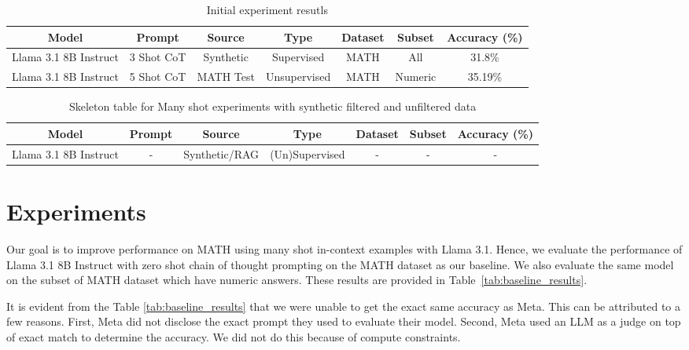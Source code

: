 \documentclass[twocolumn,11pt]{article}
\begin{document}
\begin{table*}
    \centering
    \begin{tabular}{|c|c|c|c|c|c|c|}
        \hline
        \textbf{Model} & \textbf{Prompt} & \textbf{Source}  & \textbf{Type} & \textbf{Dataset} & \textbf{Subset} & \textbf{Accuracy (\%)}\\
        \hline
        Llama 3.1 8B Instruct & 3 Shot CoT & Synthetic & Supervised & MATH & All & 31.8\% \\
        \hline
        Llama 3.1 8B Instruct & 5 Shot CoT & MATH Test & Unsupervised & MATH & Numeric & 35.19\% \\
        \hline
    \end{tabular}
    \caption{Initial experiment resutls}
    \label{tab:experiment_results}
\end{table*}

\begin{table*}[!h]
    \centering
    \begin{tabular}{|c|c|c|c|c|c|c|}
        \hline
        \textbf{Model} & \textbf{Prompt} & \textbf{Source}  & \textbf{Type} & \textbf{Dataset} & \textbf{Subset} & \textbf{Accuracy (\%)}\\
        \hline
        Llama 3.1 8B Instruct & - & Synthetic/RAG & (Un)Supervised & - & - & - \\
        \hline
    \end{tabular}
    \caption{Skeleton table for Many shot experiments with synthetic filtered and unfiltered data}
    \label{tab:synth_experiment_results}
\end{table*}

\section{Experiments} \label{sec:experiments}

Our goal is to improve performance on MATH using many shot in-context examples with Llama 3.1. Hence, we evaluate the performance of Llama 3.1 8B Instruct \cite{dubey2024llama3herdmodels} with zero shot chain of thought prompting on the MATH dataset as our baseline. We also evaluate the same model on the subset of MATH dataset which have numeric answers. These results are provided in Table~\ref{tab:baseline_results}. 

It is evident from the Table \ref{tab:baseline_results} that we were unable to get the exact same accuracy as Meta. This can be attributed to a few reasons. First, Meta did not disclose the exact prompt they used to evaluate their model. Second, Meta used an LLM as a judge on top of exact match to determine the accuracy. We did not do this because of compute constraints.
\end{document}
